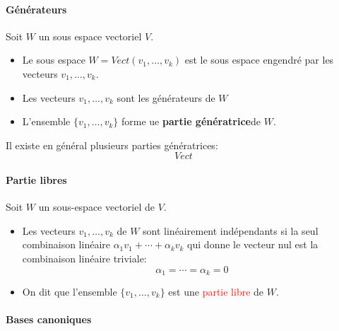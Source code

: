 \paragraph{Générateurs}
Soit $W$ un sous espace vectoriel $V$.
\begin{itemize}
    \item Le sous espace $W = Vect(v_1, \dots, v_k)$ est le sous espace engendré par les vecteurs $v_1, \dots, v_k$.
    \item Les vecteurs $v_1, \dots, v_k$ sont les générateurs de $W$
    \item L'ensemble $\{v_1, \dots, v_k\}$ forme ue \textbf{partie génératrice}de $W$.
\end{itemize}
\begin{exemple}
    Il existe en général plusieurs parties génératrices:
    \[Vect\]
\end{exemple}
\paragraph{Partie libres}
Soit $W$ un sous-espace vectoriel de $V$.
\begin{itemize}
    \item Les vecteurs $v_1, \dots, v_k$ de $W$ sont linéairement indépendants si la seul combinaison linéaire $\alpha_1v_1 + \cdots + \alpha_kv_k$ qui donne le vecteur nul est la combinaison linéaire triviale:
    \[\alpha_1 = \cdots = \alpha_k = 0\]

    \item On dit que l'ensemble $\{v_1, \dots, v_k\}$ est une \textcolor{red}{partie libre} de $W$.
\end{itemize}


\paragraph{Bases canoniques}

